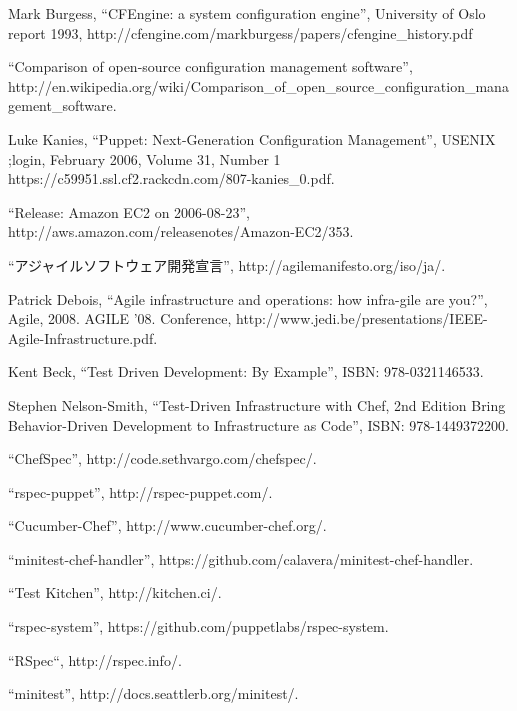 \begin{thebibliography}{99}

Mark Burgess, ``CFEngine: a system configuration engine'',
University of Oslo report 1993,
http://cfengine.com/markburgess/papers/cfengine\_history.pdf

``Comparison of open-source configuration management software'',
http://en.wikipedia.org/wiki/Comparison\_of\_open\_source\_configuration\_management\_software.

Luke Kanies,
``Puppet: Next-Generation Configuration Management'',
USENIX ;login, February 2006, Volume 31, Number 1
https://c59951.ssl.cf2.rackcdn.com/807-kanies\_0.pdf.

``Release: Amazon EC2 on 2006-08-23'',
http://aws.amazon.com/releasenotes/Amazon-EC2/353.

``アジャイルソフトウェア開発宣言'',
http://agilemanifesto.org/iso/ja/.

Patrick Debois,
``Agile infrastructure and operations: how infra-gile are you?'',
Agile, 2008. AGILE '08. Conference,
http://www.jedi.be/presentations/IEEE-Agile-Infrastructure.pdf.

Kent Beck,
``Test Driven Development: By Example'',
ISBN: 978-0321146533.

Stephen Nelson-Smith,
``Test-Driven Infrastructure with Chef, 2nd Edition
Bring Behavior-Driven Development to Infrastructure as Code'',
ISBN: 978-1449372200.

``ChefSpec'', http://code.sethvargo.com/chefspec/.

``rspec-puppet'', http://rspec-puppet.com/.

``Cucumber-Chef'', http://www.cucumber-chef.org/.

``minitest-chef-handler'', https://github.com/calavera/minitest-chef-handler.

``Test Kitchen'', http://kitchen.ci/.

``rspec-system'', https://github.com/puppetlabs/rspec-system.

``RSpec``, http://rspec.info/.

``minitest'', http://docs.seattlerb.org/minitest/.


\end{thebibliography}
